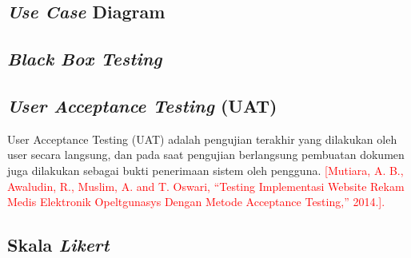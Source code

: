 \begin{flushleft}
\begin{justify}
        \subsection{\textit{Use Case} Diagram}

        \subsection{\textit{Black Box Testing}}

        \subsection{\textit{User Acceptance Testing} (UAT)}
        \noindent User Acceptance Testing (UAT) adalah pengujian terakhir yang dilakukan oleh user secara langsung, dan pada saat pengujian berlangsung pembuatan dokumen juga dilakukan sebagai bukti penerimaan sistem oleh pengguna. 
        \textcolor{red}{[Mutiara, A. B., Awaludin, R., Muslim, A. and T. Oswari, “Testing Implementasi Website Rekam Medis Elektronik Opeltgunasys Dengan Metode Acceptance Testing,” 2014.].
        }
        

        \subsection{Skala \textit{Likert}}

    \end{justify}



\end{flushleft}



\newpage